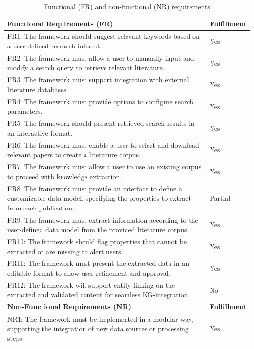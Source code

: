\documentclass[runningheads]{llncs}
\begin{document}
\begin{longtable}{m{}|>{\centering\arraybackslash}m{2cm}}
    \caption{Functional (FR) and non-functional (NR) requirements}\label{tab:requirements} \\
    \textbf{Functional Requirements (FR)} & \textbf{Fulfillment} \\
    \hline
    \endfirsthead
    \hline
    \endhead
    \endfoot
    \endlastfoot
    FR1: The framework should suggest relevant keywords based on a user-defined research interest. & Yes\\\hline
    FR2: The framework must allow a user to manually input and modify a search query to retrieve relevant literature. & Yes\\\hline
    FR3: The framework must support integration with external literature databases. & Yes\\\hline
    FR4: The framework must provide options to configure search parameters. & Yes\\\hline
    FR5: The framework should present retrieved search results in an interactive format. & Yes\\\hline
    FR6: The framework must enable a user to select and download relevant papers to create a literature corpus. & Yes\\\hline
    FR7: The framework must allow a user to use an existing corpus to proceed with knowledge extraction. & Yes\\\hline
    FR8: The framework must provide an interface to define a customizable data model, specifying the properties to extract from each publication. & Partial\\\hline
    FR9: The framework must extract information according to the user-defined data model from the provided literature corpus. & Yes\\\hline
    FR10: The framework should flag properties that cannot be extracted or are missing to alert users. & Yes\\\hline
    FR11: The framework must present the extracted data in an editable format to allow user refinement and approval. & Yes\\\hline
    FR12: The framework will support entity linking on the extracted and validated content for seamless KG-integration. & No\\\hline
    \textbf{Non-Functional Requirements (NR)} & \textbf{Fulfillment} \\\hline
    NR1: The framework must be implemented in a modular way, supporting the integration of new data sources or processing steps. & Yes\\\hline

\end{longtable}
\end{document}
